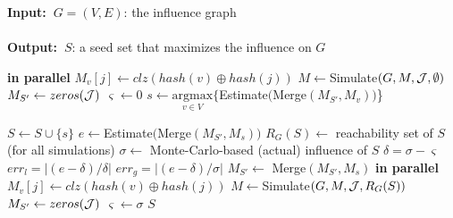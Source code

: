 \documentclass[final,5p,times,twocolumn]{elsarticle}
\renewcommand{\algorithmicrequire}{\textbf{Input:~}}
\renewcommand{\algorithmicensure}{\textbf{Output:~}}
\newcommand\acro{{\sc{HyperFuseR\xspace}\xspace}\xspace}
\newcommand\kktodo[1]{\textcolor{red}{#1}}
\newcommand\ggx[1]{\textcolor{blue}{#1}}
\begin{document}
\renewcommand{\baselinestretch}{0.95}
\begin{algorithm}
\caption{\sc{\acro}($G,K,{\cal J}$)}
\label{algo:main}
\algorithmicrequire{$G = (V,E)$: the influence graph
\\\\}
\algorithmicensure{$S$: a seed set that maximizes the influence on $G$
}
\begin{algorithmic}[1]
     {\bf in parallel}
            \State $M_v[j] \leftarrow clz(hash(v) \oplus hash(j))$ 
        \EndFor
    \EndFor
    \State $M \leftarrow ${\sc Simulate}$(G,M,{\cal J},\emptyset)$
    \State $M_{S'} \leftarrow zeros({\cal J})$
    \State $\varsigma \leftarrow 0$
     \label{line:for}
        \State $s \leftarrow \underset{v\in V}{\mathrm{argmax}}\{${\sc Estimate}$(${\sc Merge}$(M_{S'},M_v))$\}\label{line:estimate}
        
        \State $S \leftarrow S \cup \{s\}$     
        \State $e \leftarrow ${\sc Estimate}$(${\sc Merge}$(M_{S'},M_s))$\label{line:e}
        \State $R_G(S) \leftarrow$ reachability set of $S$ (for all simulations)
        \State $\sigma \leftarrow$ Monte-Carlo-based (actual) influence of $S$
        \State $\delta = \sigma - \varsigma$
        \State $err_l=|(e - \delta) / \delta|$
        \State $err_g=|(e-\delta) / \sigma|$
            \State $M_{S'} \leftarrow$ {\sc Merge}$(M_{S'},M_s)$ \label{line:if}
        \Else 
             {\bf in parallel}\label{line:else1}
                    \State $M_v[j] \leftarrow clz(hash(v) \oplus hash(j))$ 
                \EndFor
            \EndFor
            \State $M \leftarrow ${\sc Simulate}$(G,M,{\cal J},R_{G}(S))$
            \State $M_{S'} \leftarrow zeros({\cal J}) $ 
            \State $\varsigma \leftarrow \sigma $ \label{line:else2} 
        \EndIf
    \EndFor
    \State \Return $S$
\end{algorithmic}
\end{algorithm}
\renewcommand{\baselinestretch}{1}
\end{document}
